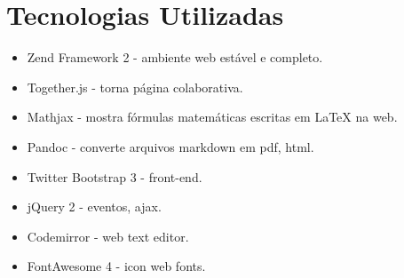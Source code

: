 \section{Tecnologias Utilizadas}

\begin{itemize}
\item
  Zend Framework 2 - ambiente web estável e completo.
\item
  Together.js - torna página colaborativa.
\item
  Mathjax - mostra fórmulas matemáticas escritas em LaTeX na web.
\item
  Pandoc - converte arquivos markdown em pdf, html.
\item
  Twitter Bootstrap 3 - front-end.
\item
  jQuery 2 - eventos, ajax.
\item
  Codemirror - web text editor.
\item
  FontAwesome 4 - icon web fonts.
\end{itemize}
